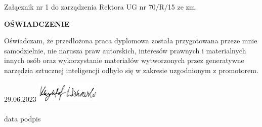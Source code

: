 \documentclass[11pt, a4paper]{article}
\begin{document}
  \begin{sloppypar}
    \raggedleft \normalsize Załącznik nr 1 do zarządzenia Rektora UG nr 70/R/15 ze zm.

    \vspace{2.5cm}


    \centering
    \Large \textbf{OŚWIADCZENIE}

    \vspace{2.5cm}


    Oświadczam, że przedłożona praca dyplomowa została przygotowana przeze mnie
    samodzielnie, nie narusza praw autorskich, interesów prawnych i materialnych innych
    osób oraz wykorzystanie materiałów wytworzonych przez generatywne narzędzia
    sztucznej inteligencji odbyło się w zakresie uzgodnionym z promotorem.

    \vspace{2.5cm}
    \centering


    \hspace{1.2cm} 29.06.2023 \hspace{6.5cm}
    \includegraphics[height=1cm]{"resources/signature.jpg"}
    \hspace{3.5cm} \\ \hspace{0.7cm} \dotfill \hspace{3cm} \dotfill \hspace{1cm} \\ \hspace{1cm}
    \small{data} \hspace{8cm} \small{podpis}
  \end{sloppypar}
\end{document}
